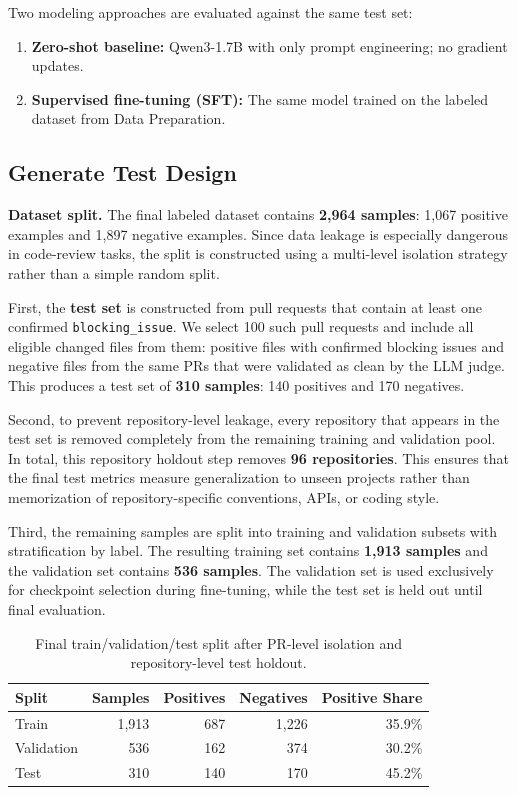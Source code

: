 \documentclass[11pt]{article}
\begin{document}
Two modeling approaches are evaluated against the same test set:

\begin{enumerate}
    \item \textbf{Zero-shot baseline:} Qwen3-1.7B with only prompt engineering; no gradient updates.
    \item \textbf{Supervised fine-tuning (SFT):} The same model trained on the labeled dataset from Data Preparation.
\end{enumerate}

\subsection*{Generate Test Design}

\textbf{Dataset split.} 
The final labeled dataset contains \textbf{2,964 samples}: 1,067 positive examples and 1,897 negative examples. Since data leakage is especially dangerous in code-review tasks, the split is constructed using a multi-level isolation strategy rather than a simple random split.

First, the \textbf{test set} is constructed from pull requests that contain at least one confirmed \texttt{blocking\_issue}. We select 100 such pull requests and include all eligible changed files from them: positive files with confirmed blocking issues and negative files from the same PRs that were validated as clean by the LLM judge. This produces a test set of \textbf{310 samples}: 140 positives and 170 negatives.

Second, to prevent repository-level leakage, every repository that appears in the test set is removed completely from the remaining training and validation pool. In total, this repository holdout step removes \textbf{96 repositories}. This ensures that the final test metrics measure generalization to unseen projects rather than memorization of repository-specific conventions, APIs, or coding style.

Third, the remaining samples are split into training and validation subsets with stratification by label. The resulting training set contains \textbf{1,913 samples} and the validation set contains \textbf{536 samples}. The validation set is used exclusively for checkpoint selection during fine-tuning, while the test set is held out until final evaluation.

\begin{table}[H]
\centering
\caption{Final train/validation/test split after PR-level isolation and repository-level test holdout.}
\label{tab:model_split}
\begin{tabular}{@{}lrrrr@{}}
\toprule
\textbf{Split} & \textbf{Samples} & \textbf{Positives} & \textbf{Negatives} & \textbf{Positive Share} \\ \midrule
Train & 1,913 & 687 & 1,226 & 35.9\% \\ \midrule
Validation & 536 & 162 & 374 & 30.2\% \\ \midrule
Test & 310 & 140 & 170 & 45.2\% \\ \bottomrule
\end{tabular}
\end{table}
\end{document}
